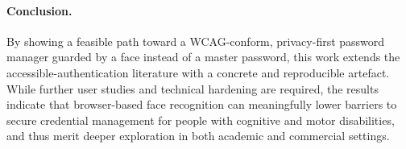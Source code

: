 \paragraph{Conclusion.}
By showing a feasible path toward a WCAG-conform, privacy-first password manager guarded by a face instead of a master password, this work extends the accessible-authentication literature with a concrete and reproducible artefact. While further user studies and technical hardening are required, the results indicate that browser-based face recognition can meaningfully lower barriers to secure credential management for people with cognitive and motor disabilities, and thus merit deeper exploration in both academic and commercial settings.

